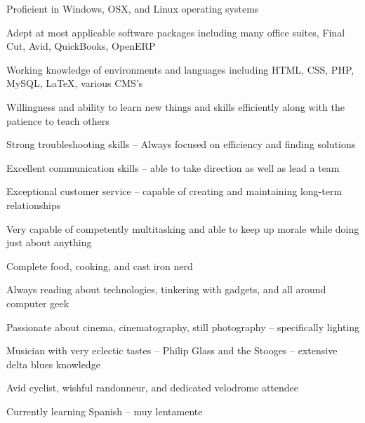 \documentclass[10pt,letterpaper]{article}			%
\newcommand{\Location}{Indianapolis, IN}			%
\begin{document}
	\begin{itemize*}
	\item Proficient in Windows, OSX, and Linux operating systems
	\item Adept at most applicable software packages including many office suites, Final Cut, Avid, QuickBooks, OpenERP
	\item Working knowledge of environments and languages including HTML, CSS, PHP, MySQL, \LaTeX, various CMS's
	\item Willingness and ability to learn new things and skills efficiently along with the patience to teach others
	\item Strong troubleshooting skills -- Always focused on efficiency and finding solutions
	\item Excellent communication skills -- able to take direction as well as lead a team
	\item Exceptional customer service -- capable of creating and maintaining long-term relationships
	\item Very capable of competently multitasking and able to keep up morale while doing just about anything
	\item Complete food, cooking, and cast iron nerd
	\item Always reading about technologies, tinkering with gadgets, and all around computer geek
	\item Passionate about cinema, cinematography, still photography -- specifically lighting
	\item Musician with very eclectic tastes -- Philip Glass and the Stooges -- extensive delta blues knowledge
	\item Avid cyclist, wishful randonneur, and dedicated velodrome attendee
	\item Currently learning Spanish -- muy lentamente
	\end{itemize*}
	
\vfill												%


\end{document}
